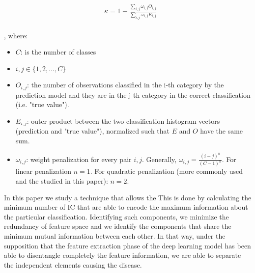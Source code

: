 \documentclass[review]{elsarticle}
\theoremstyle{definition} %
\theoremstyle{remark}
\begin{document}
\begin{equation}
\label{eq:kappa}
\begin{aligned}
&\kappa = 1 - \frac{ \sum_{i,j} \omega_{i,j} O_{i,j} }
{\sum_{i,j} \omega_{i,j} E_{i,j}}\\
\end{aligned}
\end{equation}

, where:
\begin{itemize}
	\item[] $C$: is the number of classes
	\item[] $i, j \in \{ 1, 2, ..., C\}$
	\item[] $O_{i,j}$: the number of observations classified in the i-th category by the prediction model and they are in the j-th category in the correct classification (i.e. "true value").
	\item[] $E_{i,j}$: outer product between the two classification histogram vectors (prediction and "true value"), normalized such that $E$ and $O$ have the same sum.
	\item[] $\omega_{i,j}$: weight penalization for every pair $i,j$. Generally, $\omega_{i,j} = \frac{(i-j)^n}{(C - 1)^n}$. For linear penalization $n = 1$. For quadratic penalization (more commonly used and the studied in this paper): $n = 2$.
\end{itemize}

	
In this paper we study a technique that allows the  This is done by calculating the minimum number of IC that are able to encode the maximum information about the particular classification. Identifying such components, we minimize the redundancy of feature space and we identify the components that share the minimum mutual information between each other. In that way, under the supposition that the feature extraction phase of the deep learning model has been able to disentangle completely the feature information, we are able to separate the independent elements causing the disease.
\end{document}
